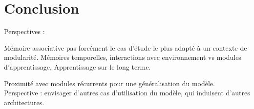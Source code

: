 \chapter*{Conclusion}

Perspectives : 

Mémoire associative pas forcément le cas d'étude le plus adapté à un contexte de modularité.
Mémoires temporelles, interactions avec environnement vs modules d'apprentissage, \cite{Ellefsen2015NeuralMH}
Apprentissage sur le long terme.

Proximité avec modules récurrents pour une généralisation du modèle.
Perspective : envisager d'autres cas d'utilisation du modèle, qui induisent d'autres architectures.